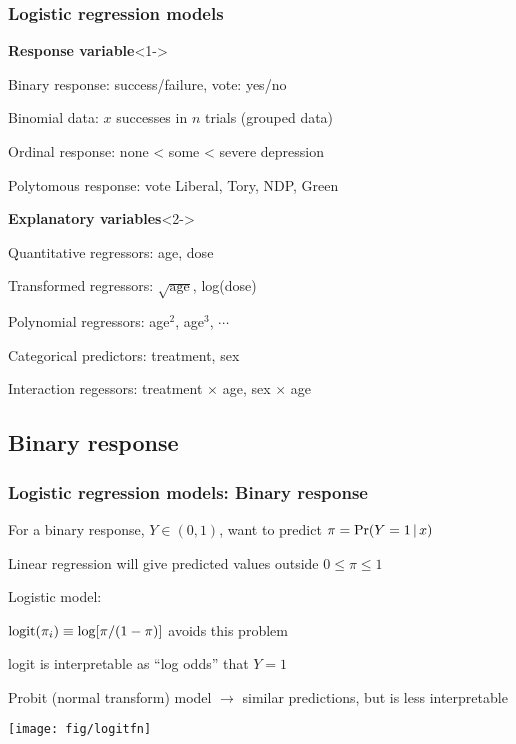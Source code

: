 \renewcommand{\FileName}{logistic1}
\begin{frame}
  \frametitle{Logistic regression models}
  \begin{block}{\large\bfseries Response variable}<1->
      \begin{itemize*}
	   \item Binary response: success/failure, vote: yes/no
	   \item Binomial data: $x$ successes in $n$ trials (grouped data)
	   \item Ordinal response: none < some < severe depression
	   \item Polytomous response: vote Liberal, Tory, NDP, Green
      \end{itemize*}
  \end{block}
  \begin{block}{\large\bfseries Explanatory variables}<2->
      \begin{itemize*}
	  \item Quantitative regressors: age, dose
	  \item Transformed regressors: $\sqrt{\mathrm{age}}$, log(dose)
	  \item Polynomial regressors: age$^2$, age$^3$, $\cdots$
	  \item Categorical predictors: treatment, sex
	  \item Interaction regessors: treatment $\times$ age, sex $\times$ age
	  \end{itemize*}
  \end{block}
\end{frame}

\subsection{Binary response}
\begin{frame}
  \frametitle{Logistic regression models: Binary response}
  \begin{itemize*}
	\item For a binary response, $Y \in (0,1)$, want to predict $\pi = \Pr(Y=1 \, | \, x)$
	\item Linear regression will give predicted values outside $0 \le \pi \le 1$
	\item Logistic model:
	\begin{itemize*}
	  \item $\logit ( \pi_{i}) \equiv \log [ \pi / (1 - \pi)]$ avoids this problem
	  \item logit is interpretable as ``log odds'' that $Y=1$
	\end{itemize*}
	
	\item Probit (normal transform) model $\rightarrow$ similar predictions, but is less
	interpretable
 \begin{center}
  \texttt{[image: fig/logitfn]}
 \end{center}
  \end{itemize*}

\end{frame}

